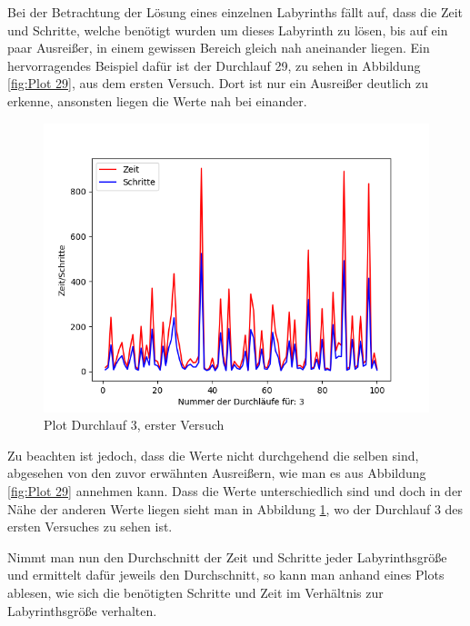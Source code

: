 \documentclass[12pt, a4paper, titlepage]{article}
\begin{document}
Bei der Betrachtung der Lösung eines einzelnen Labyrinths fällt auf, dass die Zeit und Schritte, welche benötigt wurden um dieses Labyrinth zu lösen, bis auf ein paar Ausreißer, in einem gewissen Bereich gleich nah aneinander liegen.
Ein hervorragendes Beispiel dafür ist der Durchlauf 29, zu sehen in Abbildung \ref{fig:Plot 29}, aus dem ersten Versuch.
Dort ist nur ein Ausreißer deutlich zu erkenne, ansonsten liegen die Werte nah bei einander.

\begin{figure}[h]
\centering
\includegraphics[scale=.5]{3.png}
\caption{Plot Durchlauf 3, erster Versuch}
\label{fig:Plot 3}
\end{figure}

Zu beachten ist jedoch, dass die Werte nicht durchgehend die selben sind, abgesehen von den zuvor erwähnten Ausreißern, wie man es aus Abbildung \ref{fig:Plot 29} annehmen kann.
Dass die Werte unterschiedlich sind und doch in der Nähe der anderen Werte liegen sieht man in Abbildung \ref{fig:Plot 3}, wo der Durchlauf 3 des ersten Versuches zu sehen ist.

Nimmt man nun den Durchschnitt der Zeit und Schritte jeder Labyrinthsgröße und ermittelt dafür jeweils den Durchschnitt, so kann man anhand eines Plots ablesen, wie sich die benötigten Schritte und Zeit im Verhältnis zur Labyrinthsgröße verhalten.
\end{document}
